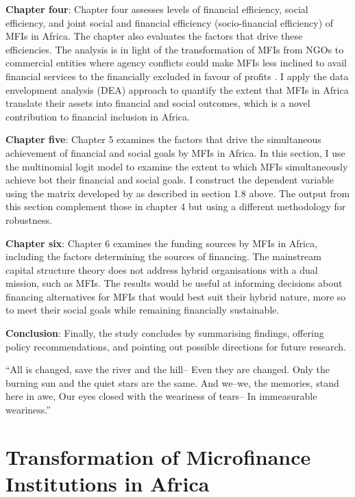 \documentclass[a4paper, nobind]{templates/ociamthesis}
\begin{document}
\textbf{Chapter four}: Chapter four assesses levels of financial efficiency, social efficiency, and joint social and financial efficiency (socio-financial efficiency) of MFIs in Africa. The chapter also evaluates the factors that drive these efficiencies. The analysis is in light of the transformation of MFIs from NGOs to commercial entities where agency conflicts could make MFIs less inclined to avail financial services to the financially excluded in favour of profits \autocite{serrano2014microfinance}. I apply the data envelopment analysis (DEA) approach to quantify the extent that MFIs in Africa translate their assets into financial and social outcomes, which is a novel contribution to financial inclusion in Africa.

\textbf{Chapter five}: Chapter 5 examines the factors that drive the simultaneous achievement of financial and social goals by MFIs in Africa. In this section, I use the multinomial logit model to examine the extent to which MFIs simultaneously achieve bot their financial and social goals. I construct the dependent variable using the matrix developed by \textcite{chattopadhyay2017applicability} as described in section 1.8 above. The output from this section complement those in chapter 4 but using a different methodology for robustness.

\textbf{Chapter six}: Chapter 6 examines the funding sources by MFIs in Africa, including the factors determining the sources of financing. The mainstream capital structure theory does not address hybrid organisations with a dual mission, such as MFIs. The results would be useful at informing decisions about financing alternatives for MFIs that would best suit their hybrid nature, more so to meet their social goals while remaining financially sustainable.

\textbf{Conclusion}: Finally, the study concludes by summarising findings, offering policy recommendations, and pointing out possible directions for future research.

\begin{savequote}
``All is changed, save the river and the hill-- Even they are changed.
Only the burning sun and the quiet stars are the same. And we--we, the
memories, stand here in awe, Our eyes closed with the weariness of
tears-- In immeasurable weariness.''
\end{savequote}



\hypertarget{cites-and-refs}{%
\chapter{Transformation of Microfinance Institutions in Africa}\label{cites-and-refs}}
\end{document}
